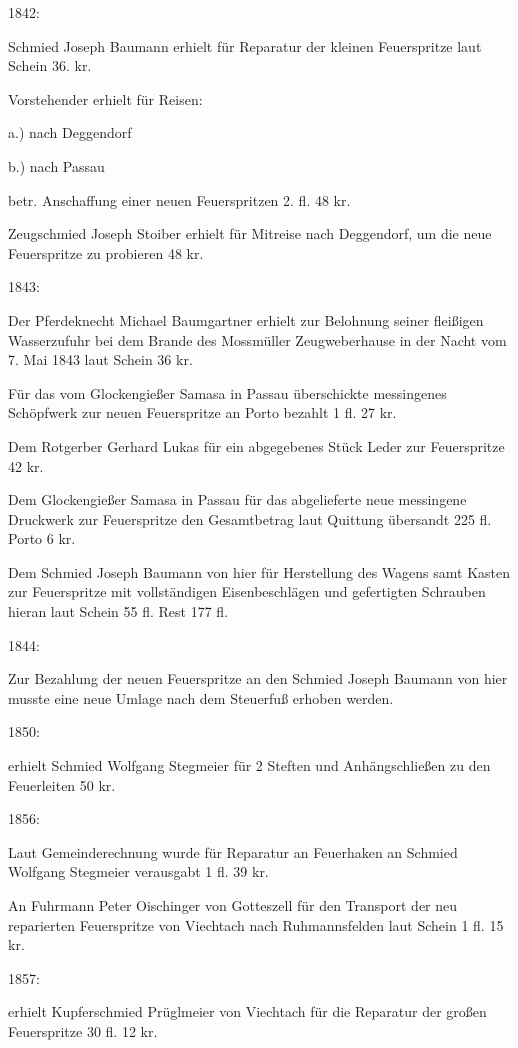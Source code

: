 \documentclass[12pt,a4pager]{book}
\begin{document}
1842:

Schmied Joseph Baumann erhielt für Reparatur der kleinen Feuerspritze laut
Schein 36. kr.

Vorstehender erhielt für Reisen:

a.) nach Deggendorf

b.) nach Passau

betr. Anschaffung einer neuen Feuerspritzen 2. fl. 48 kr.

Zeugschmied Joseph Stoiber erhielt für Mitreise nach Deggendorf, um die neue
Feuerspritze zu probieren 48 kr.

1843:

Der Pferdeknecht Michael Baumgartner erhielt zur Belohnung seiner fleißigen
Wasserzufuhr bei dem Brande des Mossmüller Zeugweberhause in der Nacht vom 7.
Mai 1843 laut Schein 36 kr.

Für das vom Glockengießer Samasa in Passau überschickte messingenes Schöpfwerk
zur neuen Feuerspritze an Porto bezahlt 1 fl. 27 kr.

Dem Rotgerber Gerhard Lukas für ein abgegebenes Stück Leder zur Feuerspritze 42
kr.

Dem Glockengießer Samasa in Passau für das abgelieferte neue messingene
Druckwerk zur Feuerspritze den Gesamtbetrag laut Quittung übersandt 225 fl.
Porto 6 kr.

Dem Schmied Joseph Baumann von hier für Herstellung des Wagens samt Kasten zur
Feuerspritze mit vollständigen Eisenbeschlägen und gefertigten Schrauben hieran
laut Schein 55 fl. Rest 177 fl.

1844:

Zur Bezahlung der neuen Feuerspritze an den Schmied Joseph Baumann von hier
musste eine neue Umlage nach dem Steuerfuß erhoben werden.

1850:

erhielt Schmied Wolfgang Stegmeier für 2 Steften und Anhängschließen zu den
Feuerleiten 50 kr.

1856:

Laut Gemeinderechnung wurde für Reparatur an Feuerhaken an Schmied Wolfgang
Stegmeier verausgabt 1 fl. 39 kr.

An Fuhrmann Peter Oischinger von Gotteszell für den Transport der neu
reparierten Feuerspritze von Viechtach nach Ruhmannsfelden laut Schein 1 fl. 15
kr.

1857:

erhielt Kupferschmied Prüglmeier von Viechtach für die Reparatur der großen
Feuerspritze 30 fl. 12 kr.
\end{document}
